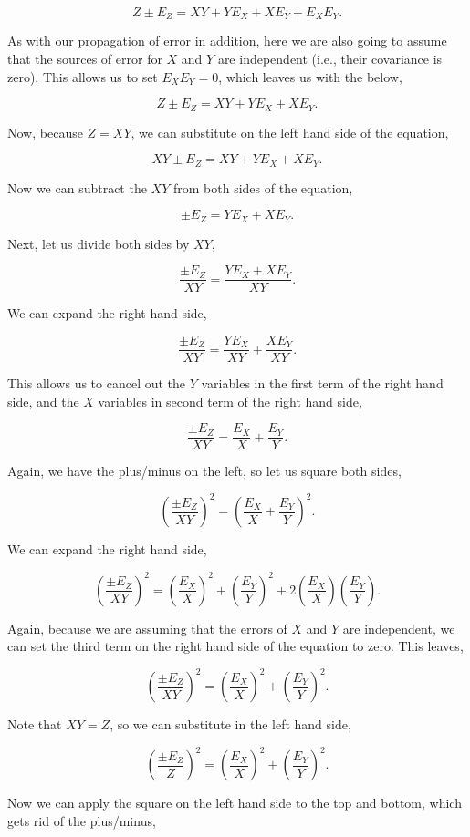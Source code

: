 \documentclass[
]{scrbook}
\begin{document}
\[Z \pm E_Z = XY + Y E_X + X E_Y + E_X E_Y.\]

As with our propagation of error in addition, here we are also going to assume that the sources of error for \(X\) and \(Y\) are independent (i.e., their covariance is zero).
This allows us to set \(E_{X}E_{Y} = 0\), which leaves us with the below,

\[Z \pm E_Z = XY + Y E_X + X E_Y.\]

Now, because \(Z = XY\), we can substitute on the left hand side of the equation,

\[XY \pm E_Z = XY + Y E_X + X E_Y.\]

Now we can subtract the \(XY\) from both sides of the equation,

\[\pm E_Z = Y E_X + X E_Y.\]

Next, let us divide both sides by \(XY\),

\[\frac{\pm E_Z}{XY} = \frac{Y E_X + X E_Y}{XY}.\]

We can expand the right hand side,

\[\frac{\pm E_Z}{XY} = \frac{Y E_X}{XY} +\frac{X E_Y}{XY}.\]

This allows us to cancel out the \(Y\) variables in the first term of the right hand side, and the \(X\) variables in second term of the right hand side,

\[\frac{\pm E_Z}{XY} = \frac{E_X}{X} +\frac{E_Y}{Y}.\]

Again, we have the plus/minus on the left, so let us square both sides,

\[\left(\frac{\pm E_Z}{XY}\right)^2 = \left(\frac{E_X}{X} +\frac{E_Y}{Y}\right)^2.\]

We can expand the right hand side,

\[\left(\frac{\pm E_Z}{XY}\right)^2 = \left(\frac{E_X}{X}\right)^2 +\left(\frac{E_Y}{Y}\right)^2 + 2\left(\frac{E_X}{X}\right)\left(\frac{E_Y}{Y}\right).\]

Again, because we are assuming that the errors of \(X\) and \(Y\) are independent, we can set the third term on the right hand side of the equation to zero.
This leaves,

\[\left(\frac{\pm E_Z}{XY}\right)^2 = \left(\frac{E_X}{X}\right)^2 +\left(\frac{E_Y}{Y}\right)^2.\]

Note that \(XY = Z\), so we can substitute in the left hand side,

\[\left(\frac{\pm E_Z}{Z}\right)^2 = \left(\frac{E_X}{X}\right)^2 +\left(\frac{E_Y}{Y}\right)^2.\]

Now we can apply the square on the left hand side to the top and bottom, which gets rid of the plus/minus,
\end{document}
